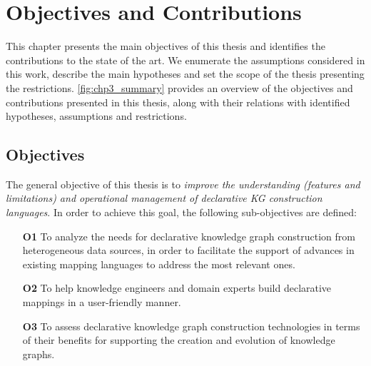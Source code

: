 \chapter{Objectives and Contributions}
\label{chapter:objectives}

This chapter presents the main objectives of this thesis and identifies the contributions to the state of the art. 
We enumerate the assumptions considered in this work, describe the main hypotheses and set the scope of the thesis presenting the restrictions. 
\cref{fig:chp3_summary} provides an overview of the objectives and contributions presented in this thesis, along with their relations with identified hypotheses, assumptions and restrictions. 

\section{Objectives}
\label{sec:chp3-objectives}



The general objective of this thesis is to \textit{improve the understanding (features and limitations) and operational management of declarative KG construction languages}. In order to achieve this goal, the following sub-objectives are defined:

\begin{enumerate}
    \item[\textbf{O1}] To analyze the needs for declarative knowledge graph construction from heterogeneous data sources, in order to facilitate the support of advances in existing mapping languages to address the most relevant ones. 
    \item[\textbf{O2}] To help knowledge engineers and domain experts build declarative mappings in a user-friendly manner.
    \item[\textbf{O3}] To assess declarative knowledge graph construction technologies in terms of their benefits for supporting the creation and evolution of knowledge graphs. 
\end{enumerate}

